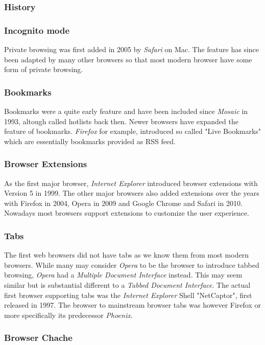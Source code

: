 \documentclass[runningheads]{llncs}
\begin{document}
			\subsubsection{History}
			\subsubsection{Incognito mode}
			Private browsing was first added in 2005 by \textit{Safari} on Mac. The feature has since been adapted by many other browsers so that most modern browser have some form of private browsing.
			\subsubsection{Bookmarks}
			Bookmarks were a quite early feature and have been included since \textit{Mosaic} in 1993, altough called hotlists back then. Newer browsers have expanded the feature of bookmarks. \textit{Firefox} for example, introduced so called "Live Bookmarks" which are essentially bookmarks provided as RSS feed.
			\subsubsection{Browser Extensions}
			As the first major browser, \textit{Internet Explorer} introduced browser extensions with Version 5 in 1999. The other major browsers also added extensions over the years with Firefox in 2004, Opera in 2009 and Google Chrome and Safari in 2010. Nowadays most browsers support extensions to customize the user experience.
			\subsubsection{Tabs}
			The first web browsers did not have tabs as we know them from most modern browsers. While many may consider \textit{Opera} to be the browser to introduce tabbed browsing, \textit{Opera} had a  \textit{Multiple Document Interface} instead. This may seem similar but is substantial different to a \textit{Tabbed Document Interface}. The actual first browser supporting tabs was the \textit{Internet Explorer} Shell "NetCaptor", first released in 1997. The browser to mainstream browser tabs was however Firefox or more specifically its predecessor \textit{Phoenix}.
			\subsubsection{Browser Chache}

\end{document}
